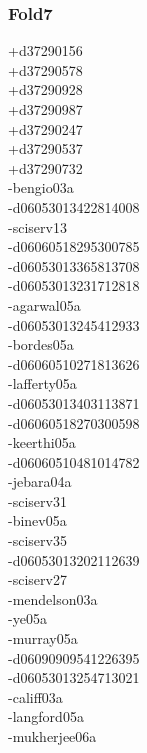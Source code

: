 \begin{multicols}{4}
\subsubsection*{Fold7}
+d37290156\\
+d37290578\\
+d37290928\\
+d37290987\\
+d37290247\\
+d37290537\\
+d37290732\\
-bengio03a\\
-d06053013422814008\\
-sciserv13\\
-d06060518295300785\\
-d06053013365813708\\
-d06053013231712818\\
-agarwal05a\\
-d06053013245412933\\
-bordes05a\\
-d06060510271813626\\
-lafferty05a\\
-d06053013403113871\\
-d06060518270300598\\
-keerthi05a\\
-d06060510481014782\\
-jebara04a\\
-sciserv31\\
-binev05a\\
-sciserv35\\
-d06053013202112639\\
-sciserv27\\
-mendelson03a\\
-ye05a\\
-murray05a\\
-d06090909541226395\\
-d06053013254713021\\
-califf03a\\
-langford05a\\
-mukherjee06a\\

\end{multicols}
